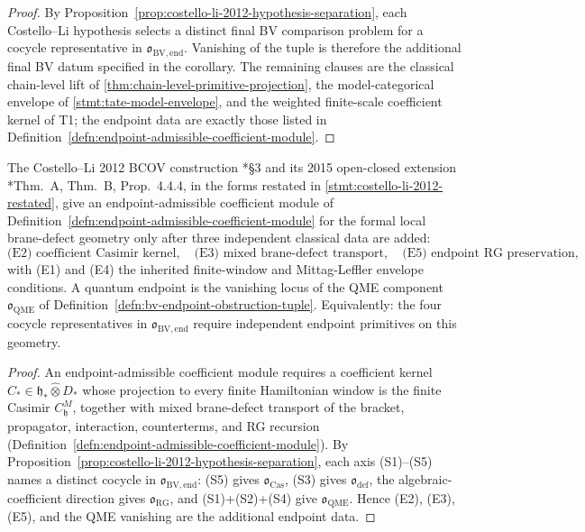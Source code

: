 \begin{proof}
  By
  Proposition~\ref{prop:costello-li-2012-hypothesis-separation}, each
  Costello--Li hypothesis selects a distinct final BV comparison problem
  for a cocycle representative in \(\mathfrak o_{\mathrm{BV,end}}\).
  Vanishing of the tuple is therefore the additional final BV datum
  specified in the corollary.  The remaining clauses are
  the classical chain-level lift of
  \ref{thm:chain-level-primitive-projection}, the model-categorical
  envelope of \ref{stmt:tate-model-envelope}, and the weighted
  finite-scale coefficient kernel of T1; the endpoint data are exactly
  those listed in
  Definition~\ref{defn:endpoint-admissible-coefficient-module}.
\end{proof}

\begin{thm}
\label{thm:costello-li-coefficient-endpoint-obstruction}
  The Costello--Li 2012 BCOV construction
  \cite{costello-li-quantum-bcov}*{\S3} and its 2015 open-closed extension
  \cite{costello-li-open-closed-bcov}*{Thm.~A, Thm.~B, Prop.~4.4.4},
  in the forms restated in
  \ref{stmt:costello-li-2012-restated}, give an endpoint-admissible
  coefficient module of
  Definition~\ref{defn:endpoint-admissible-coefficient-module} for the
  formal local brane-defect geometry only after three independent
  classical data are added:
  \[
    \text{(E2) coefficient Casimir kernel},\quad
    \text{(E3) mixed brane-defect transport},\quad
    \text{(E5) endpoint RG preservation},
	  \]
	  with (E1) and (E4) the inherited finite-window and Mittag-Leffler
	  envelope conditions.  A quantum endpoint is the vanishing locus of the
	  QME component
  \(\mathfrak o_{\mathrm{QME}}\) of
  Definition~\ref{defn:bv-endpoint-obstruction-tuple}.  Equivalently:
  the four cocycle representatives in
  \(\mathfrak o_{\mathrm{BV,end}}\) require independent endpoint
  primitives on this geometry.
\end{thm}

\begin{proof}
  An endpoint-admissible coefficient module requires a coefficient
  kernel
  \(C_\ast\in\mathfrak h_\ast\widehat\otimes D_\ast\) whose projection
  to every finite Hamiltonian window is the finite Casimir
  \(C^M_{\mathfrak h}\), together with mixed brane-defect transport of
  the bracket, propagator, interaction, counterterms, and RG recursion
  (Definition~\ref{defn:endpoint-admissible-coefficient-module}).  By
  Proposition~\ref{prop:costello-li-2012-hypothesis-separation}, each
  axis (S1)--(S5) names a distinct cocycle in
  \(\mathfrak o_{\mathrm{BV,end}}\): (S5) gives
  \(\mathfrak o_{\mathrm{Cas}}\), (S3) gives
  \(\mathfrak o_{\mathrm{def}}\), the algebraic-coefficient direction
  gives \(\mathfrak o_{\mathrm{RG}}\), and (S1)+(S2)+(S4) give
  \(\mathfrak o_{\mathrm{QME}}\).  Hence (E2), (E3), (E5), and the QME
  vanishing are the additional endpoint data.
\end{proof}

